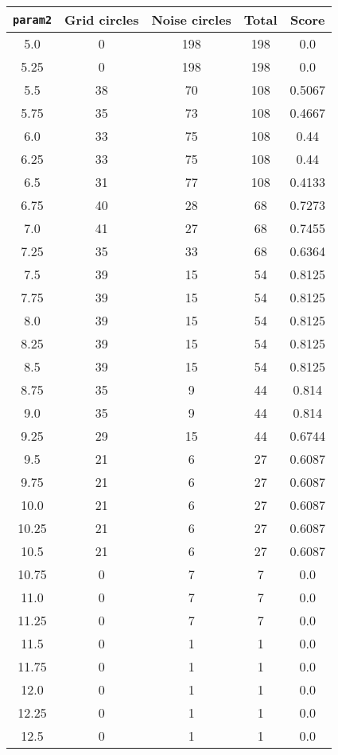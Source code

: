 \documentclass[letterpaper, 12pt]{article}
\begin{document}
\begin{longtable}{|c|c|c|c|c|}
\hline
\textbf{\texttt{param2}} & \textbf{Grid circles} & \textbf{Noise circles} & \textbf{Total} & \textbf{Score} \\
\hline
5.0 & 0 & 198 & 198 & 0.0 \\
\hline
5.25 & 0 & 198 & 198 & 0.0 \\
\hline
5.5 & 38 & 70 & 108 & 0.5067 \\
\hline
5.75 & 35 & 73 & 108 & 0.4667 \\
\hline
6.0 & 33 & 75 & 108 & 0.44 \\
\hline
6.25 & 33 & 75 & 108 & 0.44 \\
\hline
6.5 & 31 & 77 & 108 & 0.4133 \\
\hline
6.75 & 40 & 28 & 68 & 0.7273 \\
\hline
7.0 & 41 & 27 & 68 & 0.7455 \\
\hline
7.25 & 35 & 33 & 68 & 0.6364 \\
\hline
7.5 & 39 & 15 & 54 & 0.8125 \\
\hline
7.75 & 39 & 15 & 54 & 0.8125 \\
\hline
8.0 & 39 & 15 & 54 & 0.8125 \\
\hline
8.25 & 39 & 15 & 54 & 0.8125 \\
\hline
8.5 & 39 & 15 & 54 & 0.8125 \\
\hline
8.75 & 35 & 9 & 44 & 0.814 \\
\hline
9.0 & 35 & 9 & 44 & 0.814 \\
\hline
9.25 & 29 & 15 & 44 & 0.6744 \\
\hline
9.5 & 21 & 6 & 27 & 0.6087 \\
\hline
9.75 & 21 & 6 & 27 & 0.6087 \\
\hline
10.0 & 21 & 6 & 27 & 0.6087 \\
\hline
10.25 & 21 & 6 & 27 & 0.6087 \\
\hline
10.5 & 21 & 6 & 27 & 0.6087 \\
\hline
10.75 & 0 & 7 & 7 & 0.0 \\
\hline
11.0 & 0 & 7 & 7 & 0.0 \\
\hline
11.25 & 0 & 7 & 7 & 0.0 \\
\hline
11.5 & 0 & 1 & 1 & 0.0 \\
\hline
11.75 & 0 & 1 & 1 & 0.0 \\
\hline
12.0 & 0 & 1 & 1 & 0.0 \\
\hline
12.25 & 0 & 1 & 1 & 0.0 \\
\hline
12.5 & 0 & 1 & 1 & 0.0 \\

\end{longtable}
\end{document}
